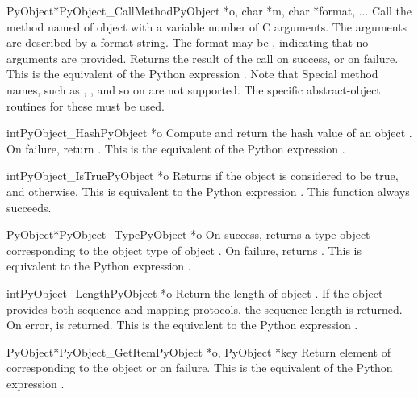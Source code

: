 \documentclass{manual}
\begin{document}
\begin{cfuncdesc}{PyObject*}{PyObject_CallMethod}{PyObject *o, char *m, char *format, ...}
Call the method named  of object  with a variable number
of C arguments.  The \C{} arguments are described by a
 format string.  The format may be \NULL{},
indicating that no arguments are provided. Returns the result of the
call on success, or \NULL{} on failure.  This is the equivalent of the
Python expression .
Note that Special method names, such as ,
, and so on are not supported. The specific
abstract-object routines for these must be used.
\end{cfuncdesc}


\begin{cfuncdesc}{int}{PyObject_Hash}{PyObject *o}
Compute and return the hash value of an object .  On
failure, return .  This is the equivalent of the Python
expression .
\end{cfuncdesc}


\begin{cfuncdesc}{int}{PyObject_IsTrue}{PyObject *o}
Returns  if the object  is considered to be true, and
 otherwise. This is equivalent to the Python expression
.
This function always succeeds.
\end{cfuncdesc}


\begin{cfuncdesc}{PyObject*}{PyObject_Type}{PyObject *o}
On success, returns a type object corresponding to the object
type of object . On failure, returns \NULL{}.  This is
equivalent to the Python expression .
\end{cfuncdesc}

\begin{cfuncdesc}{int}{PyObject_Length}{PyObject *o}
Return the length of object .  If the object  provides
both sequence and mapping protocols, the sequence length is
returned. On error,  is returned.  This is the equivalent
to the Python expression .
\end{cfuncdesc}


\begin{cfuncdesc}{PyObject*}{PyObject_GetItem}{PyObject *o, PyObject *key}
Return element of  corresponding to the object  or
\NULL{} on failure. This is the equivalent of the Python expression
.
\end{cfuncdesc}
\end{document}

